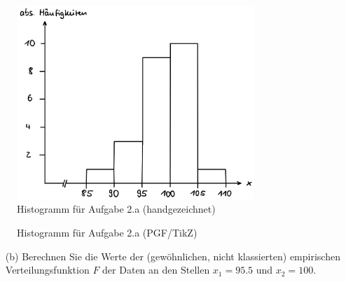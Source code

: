 \begin{figure}[H]
    \centering
    \includegraphics[width=0.8\textwidth]{assets/task2_histogramm.jpeg}
    \caption{Histogramm für Aufgabe 2.a (handgezeichnet)}
\end{figure}

\begin{figure}[H]
    \centering
    \caption{Histogramm für Aufgabe 2.a (PGF/TikZ)}
\end{figure}


\begin{task}
    \begin{enumerate}
        \item[(b)] Berechnen Sie die Werte der (gewöhnlichen, nicht klassierten) empirischen Verteilungsfunktion $F$ der Daten an den Stellen $x_1=95.5$ und $x_2=100$.
    \end{enumerate}
\end{task}


